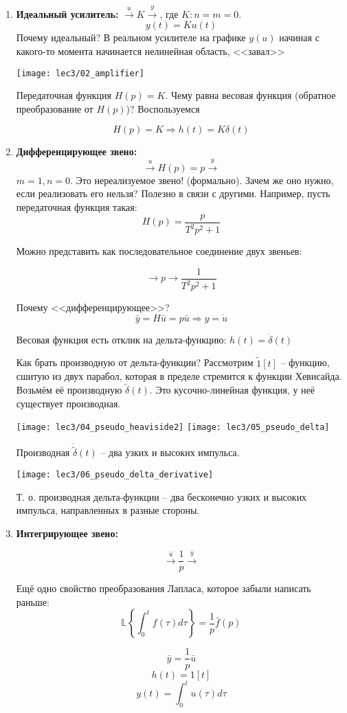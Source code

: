 \documentclass[main.tex]{subfiles}
\begin{document}
\begin{enumerate}[noitemsep]
	\item \textbf{Идеальный усилитель:} $ \xrightarrow{u} \boxed{K} \xrightarrow{y} $, где $ K: n=m=0 $.
    \[ y(t) = K u(t) \]
	Почему идеальный? В реальном усилителе на графике $ y(u) $ начиная с какого-то момента начинается нелинейная область, <<завал>>

    \texttt{[image: lec3/02\_amplifier]}

    Передаточная функция $ H(p) = K $.
    Чему равна весовая функция (обратное преобразование от $ H(p) $)?
    Воспользуемся

	\[ H(p) = K \Rightarrow h(t) = K \delta(t) \]

	\item \textbf{Дифференцирующее звено:}
    \[ \xrightarrow{u} \boxed{H(p)=p} \xrightarrow{y} \]
    $ m=1, n=0 $. Это нереализуемое звено! (формально).
	Зачем же оно нужно, если реализовать его нельзя?
	Полезно в связи с другими.
    Например, пусть передаточная функция такая:
    \[ H(p) = \frac{p}{T^2 p^2 + 1} \]

    Можно представить как последовательное соединение двух звеньев:

    \[ \to \boxed{p} \to \boxed{\frac{1}{T^2 p^2 + 1}} \]

    Почему <<дифференцирующее>>?
    \[ \bar y = H \bar u = p \bar u \Rightarrow y = \dot u \]

    Весовая функция есть отклик на дельта-функцию: $ h(t) = \dot \delta(t) $

    Как брать производную от дельта-функции?
    Рассмотрим $ \tilde 1[t] $ -- функцию, сшитую из двух парабол, которая в пределе стремится к функции Хевисайда.
    Возьмём её производную $ \tilde \delta(t) $.
    Это кусочно-линейная функция, у неё существует производная.

    \texttt{[image: lec3/04\_pseudo\_heaviside2]}
    \texttt{[image: lec3/05\_pseudo\_delta]}

    Производная $ \dot{ \tilde \delta }(t) $ -- два узких и высоких импульса.

    \texttt{[image: lec3/06\_pseudo\_delta\_derivative]}


	Т. о. производная дельта-функции -- два бесконечно узких и высоких импульса, направленных в разные стороны.

	\item \textbf{Интегрирующее звено:}

    \[ \xrightarrow{\bar u} \boxed{\frac{1}{p}}\xrightarrow{\bar y} \]

    \begin{leftbar}
        Ещё одно свойство преобразования Лапласа, которое забыли написать раньше:
        \[ \mathds{L}\left\{ \int_{0}^{t} f(\tau) d\tau \right\} = \frac{1}{p} \bar f(p) \]
    \end{leftbar}
    \[ \bar y = \frac{1}{p} \bar u \]
    \[ h(t) = 1[t] \]
    \[ y(t) = \int_{0}^{t} u(\tau) d \tau \]
\end{enumerate}
\end{document}
